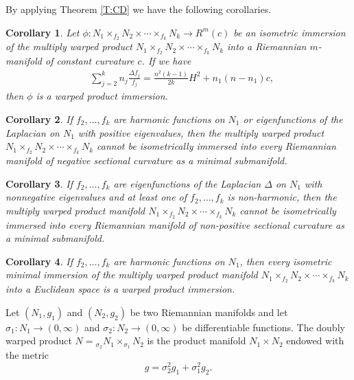 \documentclass{amsart}
\theoremstyle{plain}
\newtheorem{corollary}{Corollary}[section]
\numberwithin{equation}{section}
\theoremstyle{remark}
\numberwithin{equation}{section}
\begin{document}
By applying Theorem \ref{T:CD} we have  the following corollaries.
 
\begin{corollary}\label{C:4.1} Let $\phi:N_1 \times_{f_2} N_2 \times \cdots \times_{f_k} N_k\to R^m(c)$ be an isometric immersion of the multiply warped product $N_1 \times_{f_2} N_2 \times \cdots \times_{f_k} N_k$ into a Riemannian $m$-manifold of constant curvature $c$.  If we have
 \begin{align*}  & \sum_{j=2}^k n_j\frac{\Delta f_j}{f_j} = \frac{n^2(k-1)}{2k} H^2 + n_1(n-n_1) c, \end{align*}
 then $\phi$ is a warped product immersion.
 \end{corollary}

\begin{corollary}\label{C:4.2} If $f_2,\ldots,f_k$ are  harmonic functions on $N_1$ or
eigenfunctions of the Laplacian on $N_1$ with positive eigenvalues, then the multiply warped product  $N_1 \times_{f_2} N_2 \times \cdots \times_{f_k} N_k$  cannot be isometrically immersed into every Riemannian manifold of negative sectional curvature as a minimal submanifold.
\end{corollary}

\begin{corollary}\label{C:4.3} If $f_2,\ldots,f_k$ are  eigenfunctions of the Laplacian $\Delta$ on $N_1$ with nonnegative eigenvalues and at least one of $f_2,\ldots, f_k$ is non-harmonic, then the multiply warped product manifold $N_1\times_{f_2} N_2 \times \cdots \times_{f_k} N_k$ cannot be isometrically immersed into every Riemannian manifold of non-positive sectional curvature as a minimal submanifold.
 \end{corollary}

\begin{corollary}\label{C:4.4} If $f_2,\ldots,f_k$ are harmonic functions on $N_1$, then every isometric minimal immersion of the multiply warped product manifold
$N_1 \times_{f_2} N_2 \times \cdots \times_{f_k} N_k$ into a Euclidean space is a warped product immersion. \end{corollary}

Let $(N_{1},g_{1})$ and $(N_{2},g_{2})$ be two Riemannian manifolds and let   $\sigma_{1}:N_{1}\to (0,\infty)$ and $\sigma_{2}:N_{2}\to (0,\infty)$ be differentiable functions. The doubly warped product $N={}_{\sigma_{2}} N_{1}\times_{\sigma_{1}} N_{2} $ is the product manifold $N_{1}\times N_{2}$ endowed with the metric
$$ g=\sigma_{2}^{2}g_{1}+\sigma_{1}^{2} g_{2}.$$ 
\end{document}

